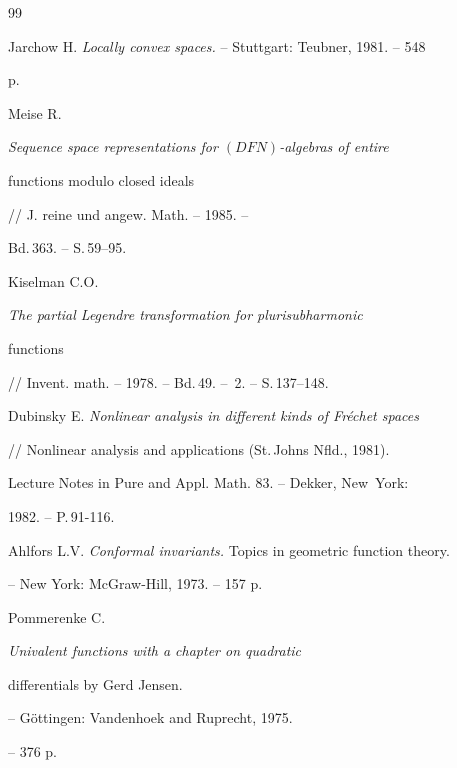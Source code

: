 \begin{thebibliography}{99}
 




Jarchow H. {\em Locally convex spaces.} -- Stuttgart: Teubner, 1981. -- 548 


p. 


 




Meise R. {\em Sequence space representations for $(DFN)$-algebras of entire 


functions modulo closed ideals} // J. reine und angew. Math. -- 1985. -- 


Bd.\,363. -- S.\,59--95. 


 




Kiselman C.O. {\em The partial Legendre transformation for plurisubharmonic 


functions} // Invent. math. -- 1978. -- Bd.\,49. -- \No\,2. -- S.\,137--148. 


 




Dubinsky E. {\em Nonlinear analysis in different kinds of Fr\'echet spaces} 


// Nonlinear analysis and applications (St.\,Johns Nfld., 1981).


Lecture Notes in Pure and Appl. Math. 83. -- Dekker, New~York:


1982. -- P.\,91-116.


 






 




Ahlfors L.V. {\em Conformal invariants.} Topics in geometric function theory. 


-- New York: McGraw-Hill, 1973. -- 157 p. 


 




Pommerenke C. {\em Univalent functions with a chapter on quadratic 


differentials by Gerd Jensen.} -- G\"ottingen: Vandenhoek and Ruprecht, 1975. 


-- 376 p. 


 


\end{thebibliography} 


 


\vskip 2cm 


 








 


 


